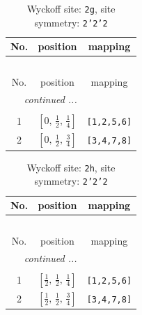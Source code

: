 \documentclass[fleqn,8pt]{jsarticle}
\begin{document}
\begin{longtable}{ccc}
\caption{Wyckoff site: {\tt 2g}, site symmetry: {\tt 2'2'2}}
 \\
 \hline \hline
No. & position & mapping \\ \hline \endfirsthead

\multicolumn{2}{l}{\tablename\ \thetable{}} \\
 \hline \hline
No. & position & mapping \\ \hline \endhead

 \hline \hline
\multicolumn{2}{r}{\footnotesize\it continued ...} \\ \endfoot

 \hline \hline
\multicolumn{2}{r}{} \\ \endlastfoot

1 & $\left[ 0,\, \frac{1}{2},\, \frac{1}{4} \right]$ & {\tt [1,2,5,6]} \\ \hline
2 & $\left[ 0,\, \frac{1}{2},\, \frac{3}{4} \right]$ & {\tt [3,4,7,8]} \\
\end{longtable}
\renewcommand{\arraystretch}{1.2}
\begin{longtable}{ccc}
\caption{Wyckoff site: {\tt 2h}, site symmetry: {\tt 2'2'2}}
 \\
 \hline \hline
No. & position & mapping \\ \hline \endfirsthead

\multicolumn{2}{l}{\tablename\ \thetable{}} \\
 \hline \hline
No. & position & mapping \\ \hline \endhead

 \hline \hline
\multicolumn{2}{r}{\footnotesize\it continued ...} \\ \endfoot

 \hline \hline
\multicolumn{2}{r}{} \\ \endlastfoot

1 & $\left[ \frac{1}{2},\, \frac{1}{2},\, \frac{1}{4} \right]$ & {\tt [1,2,5,6]} \\ \hline
2 & $\left[ \frac{1}{2},\, \frac{1}{2},\, \frac{3}{4} \right]$ & {\tt [3,4,7,8]} \\
\end{longtable}
\renewcommand{\arraystretch}{1.2}
\end{document}
